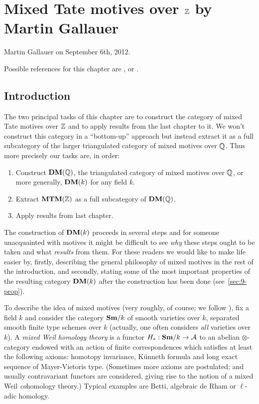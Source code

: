 \chapter{Mixed Tate motives over $\mathbb{Z}$ by Martin Gallauer}

Martin Gallauer on September 6th, 2012.

\medskip
\medskip

\noindent Possible references for this chapter are \cite{voevodsky00-mm}, \cite{andre04-motifs} or \cite{MVW-motcoh}.

\section{Introduction}
\label{sec:9-intro}

The two principal tasks of this chapter are to construct the category
of mixed Tate motives over $\mathbb{Z}$ and to apply results from the last
chapter to it. We won't construct this category in a ``bottom-up''
approach but instead extract it as a full subcategory of the larger
triangulated category of mixed motives over $\mathbb{Q}$. Thus more precisely
our tasks are, in order:
\begin{enumerate}
\item Construct $\mathbf{DM}(\mathbb{Q})$, the triangulated category of mixed motives
  over $\mathbb{Q}$, or more generally, $\mathbf{DM}(k)$ for any field $k$.
\item Extract $\mathbf{MTM}(\mathbb{Z})$ as a full subcategory of $\mathbf{DM}(\mathbb{Q})$.
\item Apply results from last chapter.
\end{enumerate}

The construction of $\mathbf{DM}(k)$ proceeds in several steps and for someone
unacquainted with motives it might be difficult to see \emph{why}
these steps ought to be taken and what \emph{results} from them. For
these readers we would like to make life easier by, firstly, describing
the general philosophy of mixed motives in the rest of the
introduction, and secondly, stating some of the most important
properties of the resulting category $\mathbf{DM}(k)$ after the construction
has been done (see~\ref{sec:9-prop}).

To describe the idea of mixed motives (very roughly, of course; we
follow \cite[chapter~14]{andre04-motifs}), fix a field $k$ and
consider the category $\mathbf{Sm}/k$ of smooth varieties over $k$, \ie{}
separated smooth finite type schemes over $k$ (actually, one often
considers \emph{all} varieties over $k$). A \emph{mixed Weil homology
  theory} is a functor $H_{*}:\mathbf{Sm}/k\to {\cal A}$ to an abelian
$\otimes$-category endowed with an action of finite correspondences
which satisfies at least the following axioms: homotopy invariance,
Künneth formula and long exact sequence of Mayer-Vietoris
type. (Sometimes more axioms are postulated; and usually contravariant
functors are considered, giving rise to the notion of a mixed Weil
\emph{co}homology theory.) Typical examples are Betti, algebraic de
Rham or $\ell$-adic homology.

